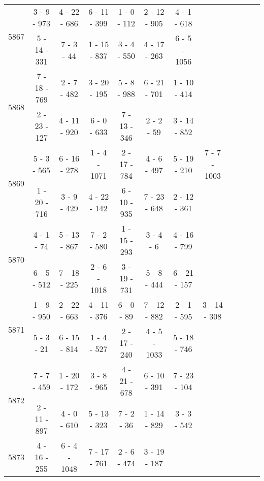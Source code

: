 \begin{longtable}{c | c | c | c | c | c | c | c | c | c | c | c}
\multirow{2}{*}{5867}
& 3 - 9 - 973
&
4 - 22 - 686
&
6 - 11 - 399
&
1 - 0 - 112
&
2 - 12 - 905
&
4 - 1 - 618
&\space\\* \space
&
5 - 14 - 331
&
7 - 3 - 44
&
1 - 15 - 837
&
3 - 4 - 550
&
4 - 17 - 263
&
6 - 5 - 1056
&\space\\\hline
\multirow{2}{*}{5868}
& 7 - 18 - 769
&
2 - 7 - 482
&
3 - 20 - 195
&
5 - 8 - 988
&
6 - 21 - 701
&
1 - 10 - 414
&\space\\* \space
&
2 - 23 - 127
&
4 - 11 - 920
&
6 - 0 - 633
&
7 - 13 - 346
&
2 - 2 - 59
&
3 - 14 - 852
&\space\\\hline
\multirow{2}{*}{5869}
& 5 - 3 - 565
&
6 - 16 - 278
&
1 - 4 - 1071
&
2 - 17 - 784
&
4 - 6 - 497
&
5 - 19 - 210
&
7 - 7 - 1003
\\* \space
&
1 - 20 - 716
&
3 - 9 - 429
&
4 - 22 - 142
&
6 - 10 - 935
&
7 - 23 - 648
&
2 - 12 - 361
&\space\\\hline
\multirow{2}{*}{5870}
& 4 - 1 - 74
&
5 - 13 - 867
&
7 - 2 - 580
&
1 - 15 - 293
&
3 - 4 - 6
&
4 - 16 - 799
&\space\\* \space
&
6 - 5 - 512
&
7 - 18 - 225
&
2 - 6 - 1018
&
3 - 19 - 731
&
5 - 8 - 444
&
6 - 21 - 157
&\space\\\hline
\multirow{2}{*}{5871}
& 1 - 9 - 950
&
2 - 22 - 663
&
4 - 11 - 376
&
6 - 0 - 89
&
7 - 12 - 882
&
2 - 1 - 595
&
3 - 14 - 308
\\* \space
&
5 - 3 - 21
&
6 - 15 - 814
&
1 - 4 - 527
&
2 - 17 - 240
&
4 - 5 - 1033
&
5 - 18 - 746
&\space\\\hline
\multirow{2}{*}{5872}
& 7 - 7 - 459
&
1 - 20 - 172
&
3 - 8 - 965
&
4 - 21 - 678
&
6 - 10 - 391
&
7 - 23 - 104
&\space\\* \space
&
2 - 11 - 897
&
4 - 0 - 610
&
5 - 13 - 323
&
7 - 2 - 36
&
1 - 14 - 829
&
3 - 3 - 542
&\space\\\hline
\multirow{2}{*}{5873}
& 4 - 16 - 255
&
6 - 4 - 1048
&
7 - 17 - 761
&
2 - 6 - 474
&
3 - 19 - 187

\end{longtable}
